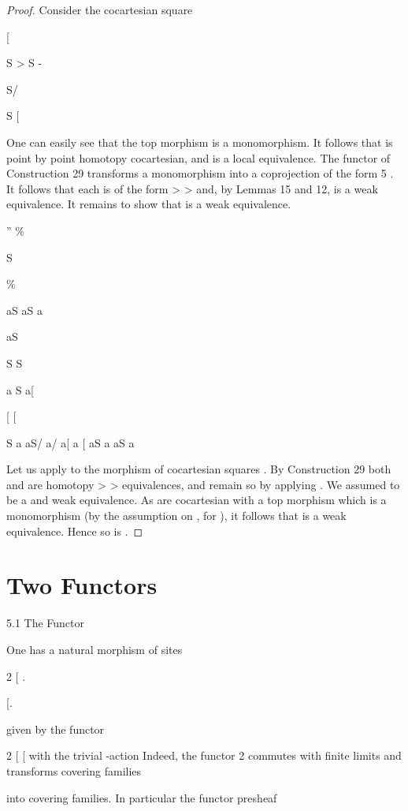 \documentclass[11pt,a4paper]{article}
\theoremstyle{plain}
\theoremstyle{definition}
\begin{document}
\begin{proof} Consider the cocartesian square

[

S >    S -  




S/  




S
[

One can easily see that the top morphism is a monomorphism. It follows that  is
point by point homotopy cocartesian, and
is a local equivalence. The
functor
of Construction 29 transforms a monomorphism into a coprojection of
the form
5
. It follows that each  is of the form
>
>
and, by Lemmas 15 and 12,
is a weak equivalence. It remains
to show that
is a weak equivalence.

''
\%

S

\% 
 
aS
aS a 

aS 

S 
S







a
S  
a[ 

[
[
 
S    
a
aS/  a/ 
a[
a [
aS a 
aS  a 

Let us apply
to the morphism of cocartesian squares 
. By Construction 29 both
and
are
homotopy
>
>
equivalences, and remain so by applying . We assumed
to be a
 and
weak equivalence. As
are cocartesian with a top morphism which
is a monomorphism (by the assumption on , for ), it follows that
is a weak equivalence. Hence so is
.


\end{proof}

\section{Two Functors}

5.1 The Functor 

 

One has a natural morphism of sites

2 [ .  

[.  

given by the functor

2 [ [    with the trivial -action
Indeed, the functor 2 commutes with finite limits and transforms covering families

into covering families.
In particular the functor
presheaf
\end{document}
